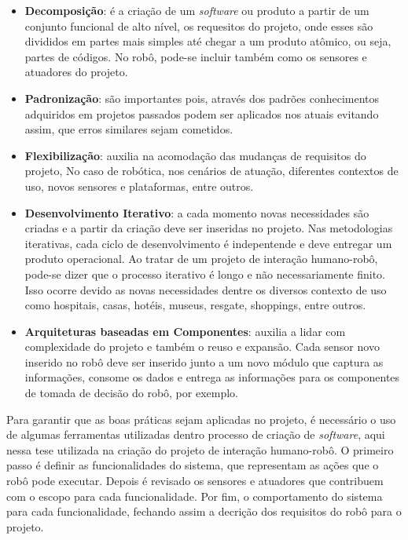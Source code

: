 \begin{itemize}
	\item \textbf{Decomposição}: é a criação de um \emph{software} ou produto a partir de um conjunto funcional de alto nível, os requesitos do projeto, onde esses são divididos em partes mais simples até chegar a um produto atômico, ou seja, partes de códigos. No robô, pode-se incluir também como os sensores e atuadores do projeto.
	\item \textbf{Padronização}: são importantes pois, através dos padrões conhecimentos adquiridos em projetos passados podem ser aplicados nos atuais evitando assim, que erros similares sejam cometidos.
	\item \textbf{Flexibilização}: auxilia na acomodação das mudanças de requisitos do projeto, No caso de robótica, nos cenários de atuação, diferentes contextos de uso, novos sensores e plataformas, entre outros.
	\item \textbf{Desenvolvimento Iterativo}: a cada momento novas necessidades são criadas e a partir da criação deve ser inseridas no projeto. Nas metodologias iterativas, cada ciclo de desenvolvimento é indepentende e deve entregar um produto operacional. Ao tratar de um projeto de interação humano-robô, pode-se dizer que o processo iterativo é longo e não necessariamente finito. Isso ocorre devido as novas necessidades dentre os diversos contexto de uso como hospitais, casas, hotéis, museus, resgate, shoppings, entre outros.
	\item \textbf{Arquiteturas baseadas em Componentes}: auxilia a lidar com complexidade do projeto e também o reuso e expansão. Cada sensor novo inserido no robô deve ser inserido junto a um novo módulo que captura as informações, consome os dados e entrega as informações para os componentes de tomada de decisão do robô, por exemplo.
\end{itemize}

Para garantir que as boas práticas sejam aplicadas no projeto, é necessário o uso de algumas ferramentas utilizadas dentro processo de criação de \emph{software}, aqui nessa tese utilizada na criação do projeto de interação humano-robô. O primeiro passo é definir as funcionalidades do sistema, que representam as ações que o robô pode executar. Depois é revisado os sensores e atuadores que contribuem com o escopo para cada funcionalidade. Por fim, o comportamento do sistema para cada funcionalidade, fechando assim a decrição dos requisitos do robô para o projeto.


